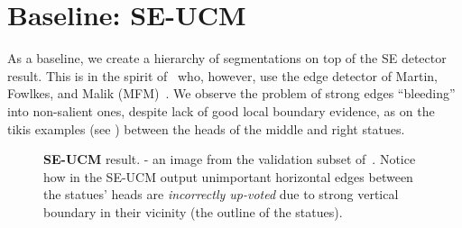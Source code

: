 \section{Baseline: SE-UCM}
As a baseline, we create a hierarchy of segmentations on top of the SE detector result. This is in the spirit of~\cite{Arbelaez2006boundary} who, however, use the edge detector of Martin, Fowlkes, and Malik (MFM)~\cite{martin2004learning}. 
We observe the problem of strong edges ``bleeding'' into non-salient ones, despite lack of good local boundary evidence, as on the tikis examples (see ) between the heads of the middle and right statues.

\begin{figure}[ht!]
\centering
{}
\caption[SE-UCM drawback - ``bleeding'' of strong edges towards unimportant ones]{{\bf SE-UCM} result. \protect{} - an image from the validation subset of~\cite{BSDS500resources}. Notice how in the SE-UCM output \protect{} unimportant horizontal edges between the statues' heads are {\it incorrectly %
up-voted} due to strong vertical boundary in their vicinity (the outline of the statues).}
\label{fig:SE-UCM-tikis-bleeding}
\end{figure}

